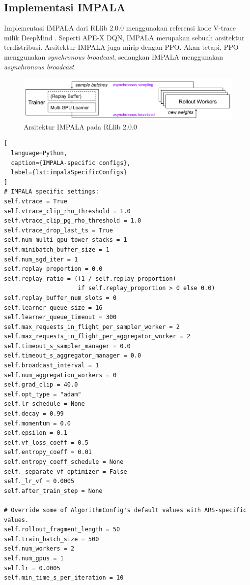 \subsection{Implementasi IMPALA}
Implementasi IMPALA dari RLlib 2.0.0 menggunakan referensi kode V-trace milik DeepMind \citep{impala}.
Seperti APE-X DQN, IMPALA merupakan sebuah arsitektur terdistribusi. Arsitektur IMPALA juga mirip dengan PPO.
Akan tetapi, PPO menggunakan \emph{synchronous broadcast}, sedangkan IMPALA menggunakan \emph{asynchronous broadcast}.

\begin{figure}[H]
  \centering
    \includegraphics[scale=0.6]{gambar/rllib_impala_architecture.png}
    \caption{Arsitektur IMPALA pada RLlib 2.0.0 \citep{rllibDocumentation}}
    \label{fig:rllib_impala_architecture}
\end{figure}

\begin{lstlisting}[
  language=Python,
  caption={IMPALA-specific configs},
  label={lst:impalaSpecificConfigs}
]
# IMPALA specific settings:
self.vtrace = True
self.vtrace_clip_rho_threshold = 1.0
self.vtrace_clip_pg_rho_threshold = 1.0
self.vtrace_drop_last_ts = True
self.num_multi_gpu_tower_stacks = 1
self.minibatch_buffer_size = 1
self.num_sgd_iter = 1
self.replay_proportion = 0.0
self.replay_ratio = ((1 / self.replay_proportion)
                     if self.replay_proportion > 0 else 0.0)
self.replay_buffer_num_slots = 0
self.learner_queue_size = 16
self.learner_queue_timeout = 300
self.max_requests_in_flight_per_sampler_worker = 2
self.max_requests_in_flight_per_aggregator_worker = 2
self.timeout_s_sampler_manager = 0.0
self.timeout_s_aggregator_manager = 0.0
self.broadcast_interval = 1
self.num_aggregation_workers = 0
self.grad_clip = 40.0
self.opt_type = "adam"
self.lr_schedule = None
self.decay = 0.99
self.momentum = 0.0
self.epsilon = 0.1
self.vf_loss_coeff = 0.5
self.entropy_coeff = 0.01
self.entropy_coeff_schedule = None
self._separate_vf_optimizer = False
self._lr_vf = 0.0005
self.after_train_step = None

# Override some of AlgorithmConfig's default values with ARS-specific values.
self.rollout_fragment_length = 50
self.train_batch_size = 500
self.num_workers = 2
self.num_gpus = 1
self.lr = 0.0005
self.min_time_s_per_iteration = 10
    
\end{lstlisting}